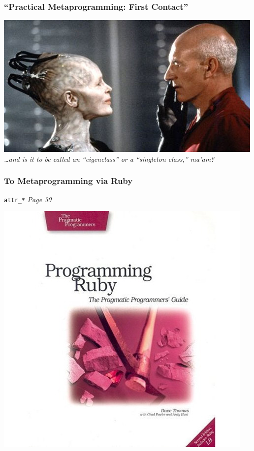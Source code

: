 \documentclass[slidestop,compress,mathserif]{beamer}
\begin{document}
\begin{frame}
	\frametitle{``Practical Metaprogramming:  First Contact''}
	\includegraphics[scale=0.55]{img/first_contact.jpg} \\
	\emph{\ldots and is it to be called an ``eigenclass'' or a ``singleton class,'' ma'am?}
\end{frame}

\begin{frame} \frametitle{To Metaprogramming via Ruby}
	\texttt{attr\_*} \emph{Page 30}
	\vskip 0.5cm
	\begin{center}
		\includegraphics[scale=0.45]{img/ruby_pickaxe.jpg}
	\end{center}
\end{frame}
\end{document}
